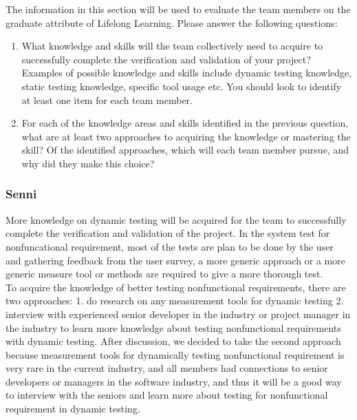 \documentclass[12pt, titlepage]{article}
\begin{document}
The information in this section will be used to evaluate the team members on the
graduate attribute of Lifelong Learning.  Please answer the following questions:

\begin{enumerate}
  \item What knowledge and skills will the team collectively need to acquire to
  successfully complete the verification and validation of your project?
  Examples of possible knowledge and skills include dynamic testing knowledge,
  static testing knowledge, specific tool usage etc.  You should look to
  identify at least one item for each team member.
  
  \item For each of the knowledge areas and skills identified in the previous
  question, what are at least two approaches to acquiring the knowledge or
  mastering the skill?  Of the identified approaches, which will each team
  member pursue, and why did they make this choice?
\end{enumerate}
\subsubsection{Senni}
More knowledge on dynamic testing will be acquired for the team to successfully complete the verification and validation of the project. In the system test for nonfuncational requirement, most of the tests are plan to be done by the user and gathering feedback from the user survey, a more generic approach or a more generic measure tool or methods are required to give a more thorough test.\\
\newline
To acquire the knowledge of better testing nonfunctional requirements, there are two approaches: 1. do research on any measurement tools for dynamic testing 2. interview with experienced senior developer in the industry or project manager in the industry to learn more knowledge about testing nonfunctional requirements with dynamic testing. After discussion, we decided to take the second approach because measurement tools for dynamically testing nonfunctional requirement is very rare in the current industry, and all members had connections to senior developers or managers in the software industry, and thus it will be a good way to interview with the seniors and learn more about testing for nonfunctional requirement in dynamic testing.
\end{document}
